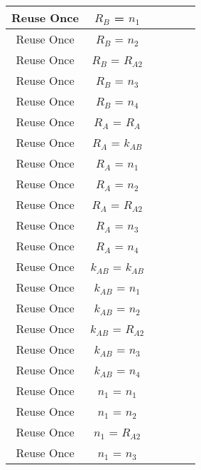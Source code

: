 \documentclass[crop]{standalone}
\newcommand{\noattack}{\color{ForestGreen}\usym{2713}\color{black}}
\newcommand{\attack}{\color{red}\usym{2717}\color{black}}
\begin{document}
{\begin{tabular}{|c|c|c|c|c|c|}
Reuse Once & $R_B$ = $n_1$ & \noattack & \noattack & \noattack & \noattack\\ \hline
Reuse Once & $R_B$ = $n_2$ & \noattack & \noattack & \noattack & \noattack\\ \hline
Reuse Once & $R_B$ = $R_{A2}$ & \noattack & \noattack & \noattack & \noattack\\ \hline
Reuse Once & $R_B$ = $n_3$ & \noattack & \noattack & \noattack & \noattack\\ \hline
Reuse Once & $R_B$ = $n_4$ & \noattack & \noattack & \noattack & \noattack\\ \hline
Reuse Once & $R_A$ = $R_A$ & \noattack & \noattack & \noattack & \noattack\\ \hline
Reuse Once & $R_A$ = $k_{AB}$ & \attack & \attack & \attack & \attack\\ \hline
Reuse Once & $R_A$ = $n_1$ & \noattack & \noattack & \noattack & \noattack\\ \hline
Reuse Once & $R_A$ = $n_2$ & \noattack & \noattack & \noattack & \noattack\\ \hline
Reuse Once & $R_A$ = $R_{A2}$ & \noattack & \noattack & \noattack & \noattack\\ \hline
Reuse Once & $R_A$ = $n_3$ & \noattack & \noattack & \noattack & \noattack\\ \hline
Reuse Once & $R_A$ = $n_4$ & \noattack & \noattack & \noattack & \noattack\\ \hline
Reuse Once & $k_{AB}$ = $k_{AB}$ & \attack & \attack & \attack & \attack\\ \hline
Reuse Once & $k_{AB}$ = $n_1$ & \attack & \attack & \attack & \attack\\ \hline
Reuse Once & $k_{AB}$ = $n_2$ & \attack & \attack & \attack & \attack\\ \hline
Reuse Once & $k_{AB}$ = $R_{A2}$ & \attack & \attack & \attack & \attack\\ \hline
Reuse Once & $k_{AB}$ = $n_3$ & \attack & \attack & \attack & \attack\\ \hline
Reuse Once & $k_{AB}$ = $n_4$ & \attack & \attack & \attack & \attack\\ \hline
Reuse Once & $n_1$ = $n_1$ & \attack & \attack & \attack & \attack\\ \hline
Reuse Once & $n_1$ = $n_2$ & \noattack & \noattack & \noattack & \noattack\\ \hline
Reuse Once & $n_1$ = $R_{A2}$ & \noattack & \noattack & \noattack & \noattack\\ \hline
Reuse Once & $n_1$ = $n_3$ & \noattack & \noattack & \noattack & \noattack\\ \hline

\end{tabular}}
\end{document}
